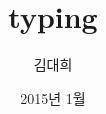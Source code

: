 \documentclass[12pt,a4paper]{book}
\begin{document}
	
			\dominitoc
			\pagestyle{empty}
			

			\title{typing}
			\author{김대희}
			\date{2015년 1월}
			\maketitle


			\tableofcontents
			\listoffigures
			\listoftables

			


\newpage
\part{ }

\newpage
\chapter{ }
\end{document}
